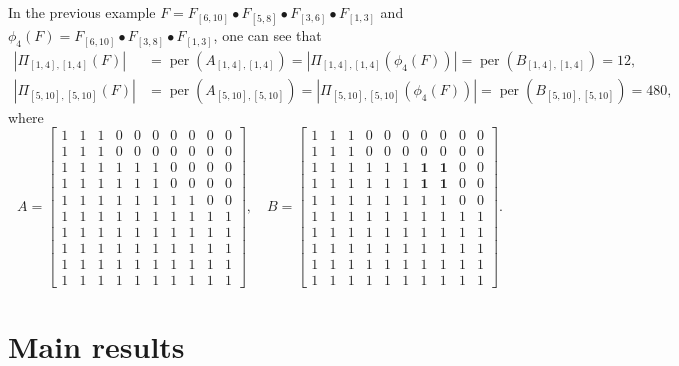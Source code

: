 \documentclass[12pt]{amsart}
\theoremstyle{definition}
\numberwithin{equation}{section}
\DeclareMathOperator{\perm}{per}
\begin{document}
In the previous example $F=F_{[6,10]} \bullet F_{[5,8]}\bullet F_{[3,6]} \bullet F_{[1,3]}$ and $\phi_4(F)=F_{[6,10]} \bullet F_{[3,8]} \bullet F_{[1,3]}$, one can see that \begin{align*}
    |\Pi_{[1,4],[1,4]}(F)| &= \perm(A_{[1,4],[1,4]}) = |\Pi_{[1,4],[1,4]}(\phi_4(F))| = \perm(B_{[1,4],[1,4]}) = 12, \\
    |\Pi_{[5,10],[5,10]}(F)| &= \perm(A_{[5,10],[5,10]}) = |\Pi_{[5,10],[5,10]}(\phi_4(F))| = \perm(B_{[5,10],[5,10]}) = 480,
\end{align*}where \begin{equation*}
    A=\begin{bmatrix}
1 & 1 & 1 & 0 & 0 & 0 & 0 & 0 & 0 & 0 \\
1 & 1 & 1 & 0 & 0 & 0 & 0 & 0 & 0 & 0 \\
1 & 1 & 1 & 1 & 1 & 1 & 0 & 0 & 0 & 0 \\
1 & 1 & 1 & 1 & 1 & 1 & 0 & 0 & 0 & 0 \\
1 & 1 & 1 & 1 & 1 & 1 & 1 & 1 & 0 & 0 \\
1 & 1 & 1 & 1 & 1 & 1 & 1 & 1 & 1 & 1 \\
1 & 1 & 1 & 1 & 1 & 1 & 1 & 1 & 1 & 1 \\
1 & 1 & 1 & 1 & 1 & 1 & 1 & 1 & 1 & 1 \\
1 & 1 & 1 & 1 & 1 & 1 & 1 & 1 & 1 & 1 \\
1 & 1 & 1 & 1 & 1 & 1 & 1 & 1 & 1 & 1
\end{bmatrix}, \quad  B=\begin{bmatrix}
1 & 1 & 1 & 0 & 0 & 0 & 0 & 0 & 0 & 0 \\
1 & 1 & 1 & 0 & 0 & 0 & 0 & 0 & 0 & 0 \\
1 & 1 & 1 & 1 & 1 & 1 & \mathbf{1} & \mathbf{1} & 0 & 0 \\
1 & 1 & 1 & 1 & 1 & 1 & \mathbf{1} & \mathbf{1} & 0 & 0 \\
1 & 1 & 1 & 1 & 1 & 1 & 1 & 1 & 0 & 0 \\
1 & 1 & 1 & 1 & 1 & 1 & 1 & 1 & 1 & 1 \\
1 & 1 & 1 & 1 & 1 & 1 & 1 & 1 & 1 & 1 \\
1 & 1 & 1 & 1 & 1 & 1 & 1 & 1 & 1 & 1 \\
1 & 1 & 1 & 1 & 1 & 1 & 1 & 1 & 1 & 1 \\
1 & 1 & 1 & 1 & 1 & 1 & 1 & 1 & 1 & 1
\end{bmatrix}.
\end{equation*}

\section{Main results}\label{s:main}
\end{document}
